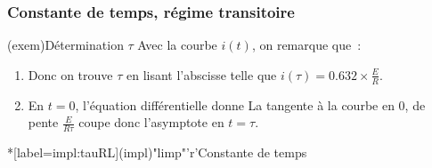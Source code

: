 \documentclass[../../main/main.tex]{subfiles}
\begin{document}
\subsubsection{Constante de temps, régime transitoire}
\begin{tcbraster}[raster columns=2, raster equal height=rows]
	\begin{tcb}[label=impl:déterm](exem){Détermination $\tau$}
		Avec la courbe $i(t)$, on remarque que~:
		\begin{enumerate}
			\item {}
			      \smallbreak
			      Donc on trouve $\tau$ en lisant l'abscisse telle que $i(\tau) =
				      \num{0.632}\times \frac{E}{R}$.
			\item En $t=0$, l'équation différentielle donne
			      \psw{
				      \[
					      \dv{i}{t}\/ (0) + \underbracket[1pt]{\frac{i(0)}{\tau}}_{=0}
					      = \frac{1}{\tau}\frac{E}{R}
				      \]
			      }
			      La tangente à la courbe en 0, de pente $\frac{E}{R\tau}$ coupe donc
			      l'asymptote en $t = \tau$.
		\end{enumerate}
	\end{tcb}
	\begin{tcb}*[label=impl:tauRL](impl)"limp"'r'{Constante de temps}
\end{tcb}
\end{tcbraster}
\end{document}
